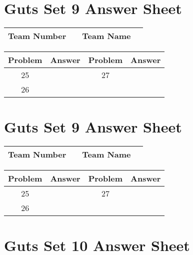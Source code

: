 \documentclass[14pt]{article}
\begin{document}
\vspace{30px}

\section*{Guts Set 9 Answer Sheet}

\begin{center}
\begin{tabular}{|r|r|r|r|}
\hline
	Team Number & \hspace{10em} &
	Team Name & \hspace{15em} \\ \hline
\end{tabular}
\end{center}
\begin{tabularx}{\textwidth}{|c|l|c|X|}\hline
	Problem & Answer & Problem & Answer \\\hline
	25 & \hspace{15em} & 27 & \\\hline
	26 & & & \\\hline
\end{tabularx}

\vspace{30px}

\section*{Guts Set 9 Answer Sheet}

\begin{center}
\begin{tabular}{|r|r|r|r|}
\hline
	Team Number & \hspace{10em} &
	Team Name & \hspace{15em} \\ \hline
\end{tabular}
\end{center}
\begin{tabularx}{\textwidth}{|c|l|c|X|}\hline
	Problem & Answer & Problem & Answer \\\hline
	25 & \hspace{15em} & 27 & \\\hline
	26 & & & \\\hline
\end{tabularx}

\section*{Guts Set 10 Answer Sheet}
\end{document}
